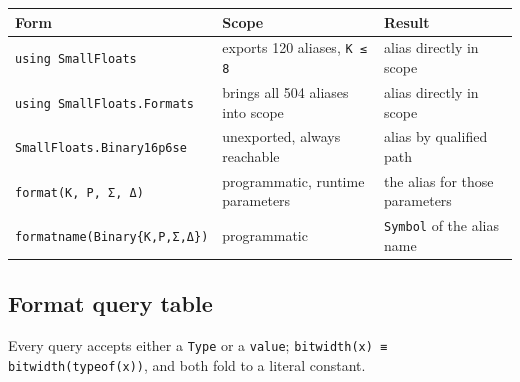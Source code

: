 \label{14939675529699646064}{}



\begin{table}[h]
\centering
\begin{tabulary}{\linewidth}{L L L}
\toprule
Form & Scope & Result \\
\toprule
\texttt{using SmallFloats} & exports 120 aliases, \texttt{K ≤ 8} & alias directly in scope \\
\texttt{using SmallFloats.Formats} & brings all 504 aliases into scope & alias directly in scope \\
\texttt{SmallFloats.Binary16p6se} & unexported, always reachable & alias by qualified path \\
\texttt{format(K, P, Σ, Δ)} & programmatic, runtime parameters & the alias for those parameters \\
\texttt{formatname(Binary\{K,P,Σ,Δ\})} & programmatic & \texttt{Symbol} of the alias name \\
\bottomrule
\end{tabulary}

\end{table}



\subsection{Format query table}



\label{3219646311892515237}{}


Every query accepts either a \texttt{Type} or a \texttt{value}; \texttt{bitwidth(\allowbreak{}x) ≡ bitwidth(\allowbreak{}typeof(\allowbreak{}x))}, and both fold to a literal constant.




